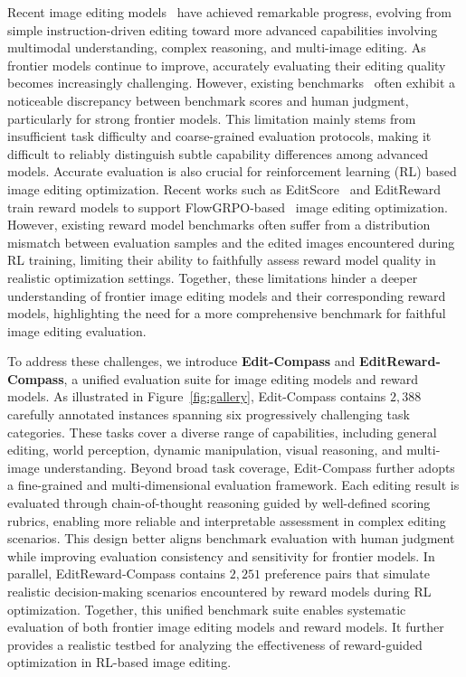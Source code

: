\documentclass{llmxive}
\providecommand{\bench}{Edit-Compass}
\providecommand{\rmbench}{EditReward-Compass}
\begin{document}
Recent image editing models~\cite{brooks2023instructpix2pix, chen2025opengpt,labs2025flux, wang2025scone,tong2026cof,zhu2026layermultilayerrepresentationfusion,zhao2024ultraedit,yu2025anyedit} have achieved remarkable progress, evolving from simple instruction-driven editing toward more advanced capabilities involving multimodal understanding, complex reasoning, and multi-image editing. 
As frontier models continue to improve, accurately evaluating their editing quality becomes increasingly challenging.
However, existing benchmarks~\cite{ye2025imgedit,liu2025step1x,pan2025ice} often exhibit a noticeable discrepancy between benchmark scores and human judgment, particularly for strong frontier models.
This limitation mainly stems from insufficient task difficulty and coarse-grained evaluation protocols, making it difficult to reliably distinguish subtle capability differences among advanced models.
Accurate evaluation is also crucial for reinforcement learning (RL) based image editing optimization.
Recent works such as EditScore~\cite{luo2025editscore} and EditReward~\cite{wu2025editreward} train reward models to support FlowGRPO-based~\cite{liu2025flow} image editing optimization.
However, existing reward model benchmarks often suffer from a distribution mismatch between evaluation samples and the edited images encountered during RL training, limiting their ability to faithfully assess reward model quality in realistic optimization settings.
Together, these limitations hinder a deeper understanding of frontier image editing models and their corresponding reward models, highlighting the need for a more comprehensive benchmark for faithful image editing evaluation.



To address these challenges, we introduce \textbf{{\bench}} and \textbf{{\rmbench}}, a unified evaluation suite for image editing models and reward models.
As illustrated in Figure~\ref{fig:gallery}, {\bench} contains $2,388$ carefully annotated instances spanning six progressively challenging task categories.
These tasks cover a diverse range of capabilities, including general editing, world perception, dynamic manipulation, visual reasoning, and multi-image understanding.
Beyond broad task coverage, {\bench} further adopts a fine-grained and multi-dimensional evaluation framework.
Each editing result is evaluated through chain-of-thought reasoning guided by well-defined scoring rubrics, enabling more reliable and interpretable assessment in complex editing scenarios.
This design better aligns benchmark evaluation with human judgment while improving evaluation consistency and sensitivity for frontier models.
In parallel, {\rmbench} contains $2,251$ preference pairs that simulate realistic decision-making scenarios encountered by reward models during RL optimization.
Together, this unified benchmark suite enables systematic evaluation of both frontier image editing models and reward models.
It further provides a realistic testbed for analyzing the effectiveness of reward-guided optimization in RL-based image editing.
\end{document}
